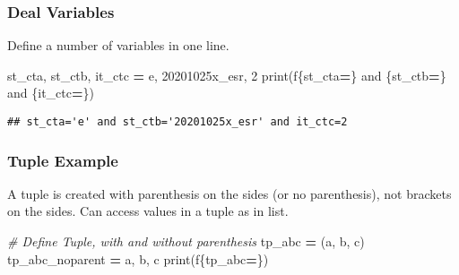 \documentclass[
]{book}
\newenvironment{Shaded}{\begin{snugshade}}{\end{snugshade}}
\newcommand{\BuiltInTok}[1]{#1}
\newcommand{\CommentTok}[1]{\textcolor[rgb]{0.56,0.35,0.01}{\textit{#1}}}
\newcommand{\DecValTok}[1]{\textcolor[rgb]{0.00,0.00,0.81}{#1}}
\newcommand{\NormalTok}[1]{#1}
\newcommand{\OperatorTok}[1]{\textcolor[rgb]{0.81,0.36,0.00}{\textbf{#1}}}
\newcommand{\SpecialCharTok}[1]{\textcolor[rgb]{0.00,0.00,0.00}{#1}}
\newcommand{\SpecialStringTok}[1]{\textcolor[rgb]{0.31,0.60,0.02}{#1}}
\newcommand{\StringTok}[1]{\textcolor[rgb]{0.31,0.60,0.02}{#1}}
\begin{document}
\hypertarget{deal-variables}{%
\subsubsection{Deal Variables}\label{deal-variables}}

Define a number of variables in one line.

\begin{Shaded}
\begin{Highlighting}[]
\NormalTok{st\_cta, st\_ctb, it\_ctc }\OperatorTok{=} \StringTok{\textquotesingle{}e\textquotesingle{}}\NormalTok{, }\StringTok{\textquotesingle{}20201025x\_esr\textquotesingle{}}\NormalTok{, }\DecValTok{2}
\BuiltInTok{print}\NormalTok{(}\SpecialStringTok{f\textquotesingle{}}\SpecialCharTok{\{}\NormalTok{st\_cta}\OperatorTok{=}\SpecialCharTok{\}}\SpecialStringTok{ and }\SpecialCharTok{\{}\NormalTok{st\_ctb}\OperatorTok{=}\SpecialCharTok{\}}\SpecialStringTok{ and }\SpecialCharTok{\{}\NormalTok{it\_ctc}\OperatorTok{=}\SpecialCharTok{\}}\SpecialStringTok{\textquotesingle{}}\NormalTok{)}
\end{Highlighting}
\end{Shaded}

\begin{verbatim}
## st_cta='e' and st_ctb='20201025x_esr' and it_ctc=2
\end{verbatim}

\hypertarget{tuple-example}{%
\subsubsection{Tuple Example}\label{tuple-example}}

A tuple is created with parenthesis on the sides (or no parenthesis), not brackets on the sides. Can access values in a tuple as in list.

\begin{Shaded}
\begin{Highlighting}[]
\CommentTok{\# Define Tuple, with and without parenthesis}
\NormalTok{tp\_abc }\OperatorTok{=}\NormalTok{ (}\StringTok{\textquotesingle{}a\textquotesingle{}}\NormalTok{, }\StringTok{\textquotesingle{}b\textquotesingle{}}\NormalTok{, }\StringTok{\textquotesingle{}c\textquotesingle{}}\NormalTok{)}
\NormalTok{tp\_abc\_noparent }\OperatorTok{=} \StringTok{\textquotesingle{}a\textquotesingle{}}\NormalTok{, }\StringTok{\textquotesingle{}b\textquotesingle{}}\NormalTok{, }\StringTok{\textquotesingle{}c\textquotesingle{}}
\BuiltInTok{print}\NormalTok{(}\SpecialStringTok{f\textquotesingle{}}\SpecialCharTok{\{}\NormalTok{tp\_abc}\OperatorTok{=}\SpecialCharTok{\}}\SpecialStringTok{\textquotesingle{}}\NormalTok{)}
\end{Highlighting}
\end{Shaded}
\end{document}
